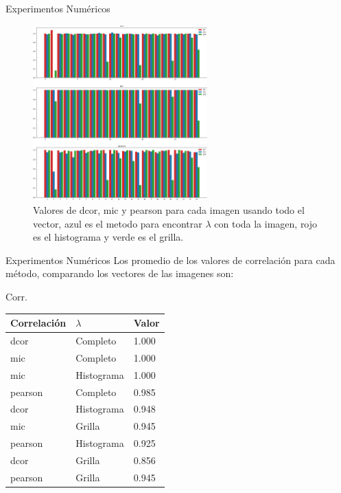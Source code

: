 \documentclass{beamer}
\begin{document}
\begin{frame}{Experimentos Numéricos}
    \begin{figure}[H]
        \centering
        \includegraphics[width=0.6\textwidth]{plot_comparison_full.png}
        \caption{Valores de dcor, mic y pearson para cada imagen usando todo el vector, azul es el metodo para encontrar $\lambda$ con toda la imagen, rojo es el histograma y verde es el grilla.}
    \end{figure}
\end{frame}
\begin{frame}{Experimentos Numéricos}
    Los promedio de los valores de correlación para cada método, comparando los vectores de las imagenes son:
    \begin{block}{Corr.} 
        \begin{table}[H]
            \centering
            \begin{tabular}{|l|l|l|}
                \hline
            Correlaci\'on    & $\lambda$ & Valor  \\    \hline
            dcor    & Completo    & 1.000  \\
            mic     & Completo    & 1.000  \\
            mic     & Histograma  & 1.000  \\
            pearson & Completo    & 0.985 \\
            dcor    & Histograma  & 0.948 \\
            mic     & Grilla      & 0.945  \\
            pearson & Histograma  & 0.925  \\
            dcor    & Grilla      & 0.856  \\
            pearson & Grilla      & 0.945  \\     \hline
    
            \end{tabular}
        \end{table}
    \end{block}
\end{frame}
\end{document}
